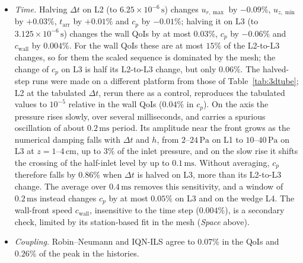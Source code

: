 \begin{itemize}
	\item \emph{Time.} Halving $\Delta t$ on L2 (to $6.25\times10^{-6}\,\mathrm{s}$) changes $u_{r,\max}$ by $-0.09\%$, $u_{z,\min}$ by $+0.03\%$, $t_\mathrm{arr}$ by $+0.01\%$ and $c_p$ by $-0.01\%$; halving it on L3 (to $3.125\times10^{-6}\,\mathrm{s}$) changes the wall QoIs by at most $0.03\%$, $c_p$ by $-0.06\%$ and $c_\mathrm{wall}$ by $0.004\%$. For the wall QoIs these are at most $15\%$ of the L2-to-L3 changes, so for them the scaled sequence is dominated by the mesh; the change of $c_p$ on L3 is half its L2-to-L3 change, but only $0.06\%$. The halved-step runs were made on a different platform from those of Table~\ref{tab:3dtube}; L2 at the tabulated $\Delta t$, rerun there as a control, reproduces the tabulated values to $10^{-5}$ relative in the wall QoIs ($0.04\%$ in $c_p$). On the axis the pressure rises slowly, over several milliseconds, and carries a spurious oscillation of about $0.2\,\mathrm{ms}$ period. Its amplitude near the front grows as the numerical damping falls with $\Delta t$ and $h$, from $2$--$24\,\mathrm{Pa}$ on L1 to $10$--$40\,\mathrm{Pa}$ on L3 at $z = 1$--$4\,\mathrm{cm}$, up to $3\%$ of the inlet pressure, and on the slow rise it shifts the crossing of the half-inlet level by up to $0.1\,\mathrm{ms}$. Without averaging, $c_p$ therefore falls by $0.86\%$ when $\Delta t$ is halved on L3, more than its L2-to-L3 change. The average over $0.4\,\mathrm{ms}$ removes this sensitivity, and a window of $0.2\,\mathrm{ms}$ instead changes $c_p$ by at most $0.05\%$ on L3 and on the wedge L4. The wall-front speed $c_\mathrm{wall}$, insensitive to the time step ($0.004\%$), is a secondary check, limited by its station-based fit in the mesh (\emph{Space} above).
	\item \emph{Coupling.} Robin--Neumann and IQN-ILS agree to $0.07\%$ in the QoIs and $0.26\%$ of the peak in the histories.

\end{itemize}
